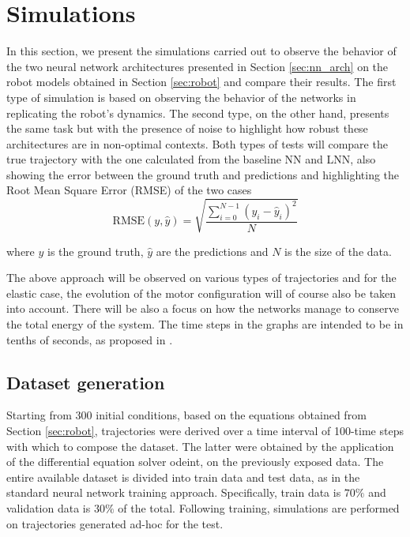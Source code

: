 \documentclass[a4paper]{article}
\begin{document}
\section{Simulations}
\label{sec:sim}
In this section, we present the simulations carried out to observe the behavior of the two neural network architectures presented in Section \ref{sec:nn_arch} on the robot models obtained in Section \ref{sec:robot} and compare their results. The first type of simulation is based on observing the behavior of the networks in replicating the robot's dynamics. The second type, on the other hand, presents the same task but with the presence of noise to highlight how robust these architectures are in non-optimal contexts. Both types of tests will compare the true trajectory with the one calculated from the baseline NN and LNN, also showing the error between the ground truth and predictions and highlighting the Root Mean Square Error (RMSE) of the two cases \\
\begin{equation}
    \nonumber
    \text{RMSE}(y, \hat{y}) = \sqrt{\frac{\sum_{i=0}^{N - 1} (y_i - \hat{y}_i)^2}{N}}
\end{equation}

where $y$ is the ground truth, $\hat{y}$ are the predictions and $N$ is
the size of the data.

The above approach will be observed on various types of trajectories and for the elastic case, the evolution of the motor configuration will of course also be taken into account. There will be also a focus on how the networks manage to conserve the total energy of the system. The time steps in the graphs are intended to be in tenths of seconds, as proposed in \cite{lnncranmer}.

\subsection{Dataset generation}
Starting from 300 initial conditions, based on the equations obtained from Section \ref{sec:robot}, trajectories were derived over a time interval of 100-time steps with which to compose the dataset. The latter were obtained by the application of the differential equation solver odeint, on the previously exposed data. The entire available dataset is divided into train data and test data, as in the standard neural network training approach. Specifically, train data is $70\%$ and validation data is $30\%$ of the total. Following training, simulations are performed on trajectories generated ad-hoc for the test.
\end{document}
